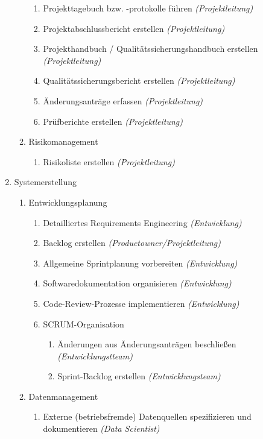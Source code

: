 \begin{enumerate}
\begin{enumerate}
\begin{enumerate}
				\item Projekttagebuch bzw. -protokolle führen \textit{(Projektleitung)}
				\item Projektabschlussbericht erstellen \textit{(Projektleitung)}
				\item Projekthandbuch / Qualitätssicherungshandbuch erstellen \textit{(Projektleitung)}
				\item Qualitätssicherungsbericht erstellen \textit{(Projektleitung)}
				\item Änderungsanträge erfassen \textit{(Projektleitung)}
				\item Prüfberichte erstellen \textit{(Projektleitung)}
			\end{enumerate}
			\item Risikomanagement
			\begin{enumerate}
				\item Risikoliste erstellen \textit{(Projektleitung)}
			\end{enumerate}
		\end{enumerate}
	\item Systemerstellung	
		\begin{enumerate}
			\item Entwicklungsplanung
				\begin{enumerate}
					\item Detailliertes Requirements Engineering \textit{(Entwicklung)}
					\item Backlog erstellen \textit{(Productowner/Projektleitung)}
					\item Allgemeine Sprintplanung vorbereiten \textit{(Entwicklung)}
					\item Softwaredokumentation organisieren \textit{(Entwicklung)}
					\item Code-Review-Prozesse implementieren \textit{(Entwicklung)}
					\item SCRUM-Organisation
					\begin{enumerate}
						\item Änderungen aus Änderungsanträgen beschließen \textit{(Entwicklungstteam)}
						\item Sprint-Backlog erstellen \textit{(Entwicklungsteam)}	
					\end{enumerate}		
				\end{enumerate}				
			\item Datenmanagement
				\begin{enumerate}
					\item Externe (betriebsfremde) Datenquellen spezifizieren und dokumentieren \colorbox{hellgreen}{\textit{(Data Scientist)}} 

\end{enumerate}
\end{enumerate}
\end{enumerate}
